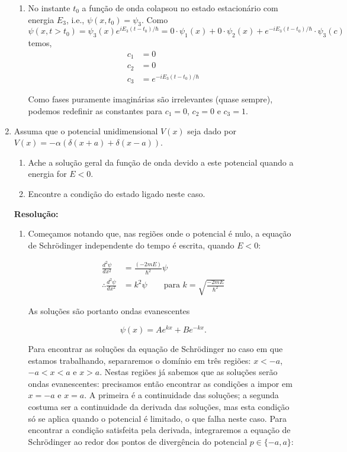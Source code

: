 \documentclass[a4paper, 12pt, notitlepage]{article}
\begin{document}
\begin{enumerate}
  \begin{enumerate}
  \item No instante $t_0$ a função de onda colapsou no estado estacionário com energia $E_3$, i.e., $\psi(x, t_0) = \psi_3$. Como $\psi(x, t > t_0 ) = \psi_3(x)e^{iE_3(t-t_0)/\hbar} = 0 \cdot \psi_1(x) + 0\cdot \psi_2(x) + e^{-iE_3(t - t_0)/\hbar}\cdot \psi_3(c)$ temos,
  \begin{align*}
    c_1 &= 0 \\
    c_2 &= 0 \\
    c_3 &= e^{-iE_3(t - t_0)/\hbar}
  \end{align*}
  
  Como fases puramente imaginárias são irrelevantes (quase sempre), podemos redefinir as constantes para $c_1 = 0$, $c_2 = 0$ e $c_3 = 1$.
  \end{enumerate}

\item Assuma que o potencial unidimensional $V(x)$ seja dado por $V(x) = -\alpha\left(\delta(x+a) + \delta(x-a)\right)$. 

  \begin{enumerate}  
  \item Ache a solução geral da função de onda devido a este potencial quando a energia for $E < 0$.
  \item Encontre a condição do estado ligado neste caso.
  \end{enumerate}

\textbf{Resolução:}\newline
  \begin{enumerate}
    \item Começamos notando que, nas regiões onde o potencial é nulo, a equação de Schrödinger independente do tempo é escrita, quando $E < 0$:

    \begin{align*}
    \frac{d^2 \psi}{dx^2} &= \frac{\left(-2mE\right)}{\hbar^2} \psi \\
    \therefore \frac{d^2 \psi}{dx^2} &= k^2 \psi \qquad \text{para } k = \sqrt{\frac{-2mE}{\hbar^2}}
    \end{align*}

    As soluções são portanto ondas evanescentes

    \begin{equation*}
    \psi(x) = A e^{kx} + B e^{-kx}.
    \end{equation*}

    Para encontrar as soluções da equação de Schrödinger no caso em que estamos trabalhando, separaremos o domínio em três regiões: $x < -a$, $-a < x < a$ e $x > a$. Nestas regiões já sabemos que as soluções serão ondas evanescentes: precisamos então encontrar as condições a impor em $x = -a$ e $x = a$. A primeira é a continuidade das soluções; a segunda costuma ser a continuidade da derivada das soluções, mas esta condição só se aplica quando o potencial é limitado, o que falha neste caso. Para encontrar a condição satisfeita pela derivada, integraremos a equação de Schrödinger ao redor dos pontos de divergência do potencial $p \in \{-a, a\}$:


\end{enumerate}
\end{enumerate}
\end{document}
